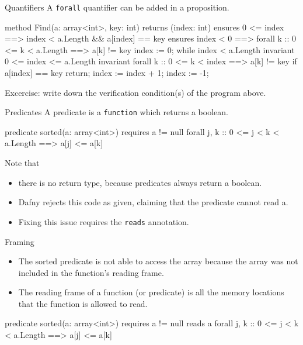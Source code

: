 \documentclass[10pt, compress]{beamer}
\begin{document}
\begin{frame}[fragile]{Quantifiers}
  A \verb|forall| quantifier can be added in a proposition.

  \begin{verbnobox}[\scriptsize]
method Find(a: array<int>, key: int) returns (index: int)
   ensures 0 <= index ==> index < a.Length && a[index] == key
   ensures index < 0 ==> forall k :: 0 <= k < a.Length ==> a[k] != key
{
   index := 0;
   while index < a.Length
      invariant 0 <= index <= a.Length
      invariant forall k :: 0 <= k < index ==> a[k] != key
   {
      if a[index] == key { return; }
      index := index + 1;
   }
   index := -1;
}
  \end{verbnobox}
  Excercise: write down the verification condition(s) of the program above.
\end{frame}

\begin{frame}[fragile]{Predicates}
  A predicate is a \verb|function| which returns a boolean. 
  \begin{verbnobox}[\footnotesize]
predicate sorted(a: array<int>)
   requires a != null
{
   forall j, k :: 0 <= j < k < a.Length ==> a[j] <= a[k]
}
  \end{verbnobox}
Note that
  \begin{itemize}
  \item there is no return type, because predicates always return a boolean.
  \item Dafny rejects this code as given, claiming that the predicate cannot read a.
  \item Fixing this issue requires the \verb|reads| annotation.
  \end{itemize}
\end{frame}

\begin{frame}[fragile]{Framing}
  \begin{itemize}
  \item The sorted predicate is not able to access the array because the array was not included in the function's reading frame.
  \item The reading frame of a function (or predicate) is all the memory locations that the function is allowed to read. 
  \end{itemize}
  \begin{verbnobox}[\footnotesize]
predicate sorted(a: array<int>)
   requires a != null
   reads a
{
   forall j, k :: 0 <= j < k < a.Length ==> a[j] <= a[k]
}
  \end{verbnobox}
\end{frame}
\end{document}
